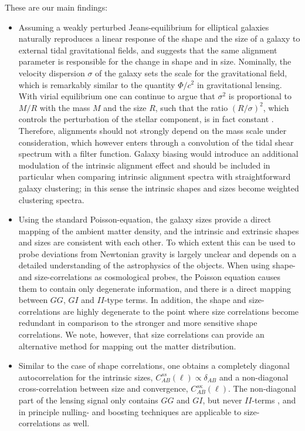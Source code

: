 \documentclass[a4paper,fleqn,usenatbib]{mnras}
\begin{document}
These are our main findings:
\begin{itemize}
\item{Assuming a weakly perturbed Jeans-equilibrium for elliptical galaxies naturally reproduces a linear response of the shape and the size of a galaxy to external tidal gravitational fields, and suggests that the same alignment parameter is responsible for the change in shape and in size. Nominally, the velocity dispersion $\sigma$ of the galaxy sets the scale for the gravitational field, which is remarkably similar to the quantity $\Phi/c^2$ in gravitational lensing. With virial equilibrium one can continue to argue that $\sigma^2$ is proportional to $M/R$ with the mass $M$ and the size $R$, such that the ratio $(R/\sigma)^2$, which controls the perturbation of the stellar component, is in fact constant \citep[compare][]{piras_mass_2018}. Therefore, alignments should not strongly depend on the mass scale under consideration, which however enters through a convolution of the tidal shear spectrum with a filter function. Galaxy biasing would introduce an additional modulation of the intrinsic alignment effect and should be included in particular when comparing intrinsic alignment spectra with  straightforward galaxy clustering; in this sense the intrinsic shapes and sizes become weighted clustering spectra.}

\item{Using the standard Poisson-equation, the galaxy sizes provide a direct mapping of the ambient matter density, and  the intrinsic and extrinsic shapes and sizes are consistent with each other. To which extent this can be used to probe deviations from Newtonian gravity is largely unclear and depends on a detailed understanding of the astrophysics of the objects. When using shape- and size-correlations as cosmological probes, the Poisson equation causes them to contain only degenerate information, and there is a direct mapping between $GG$, $GI$ and $II$-type terms. In addition, the shape and size-correlations are highly degenerate to the point where size correlations become redundant in comparison to the stronger and more sensitive shape correlations. We note, however, that size correlations can provide an alternative method for mapping out the matter distribution.}

\item{Similar to the case of shape correlations, one obtains a completely diagonal autocorrelation for the intrinsic sizes, $C^{ss}_{AB}(\ell)\propto\delta_{AB}$ and a non-diagonal cross-correlation between size and convergence, $C^{s\kappa}_{AB}(\ell)$. The non-diagonal part of the lensing signal only contains $GG$ and $GI$, but never $II$-terms \citep{jain_cross-correlation_2003, takada_tomography_2004, huterer_nulling_2005}, and in principle nulling- and boosting techniques \citep{joachimi_removal_2009, joachimi_controlling_2010, joachimi_intrinsic_2010} are applicable to size-correlations as well.}


\end{itemize}
\end{document}
